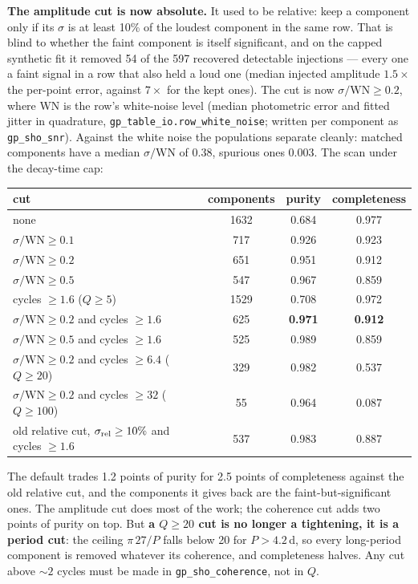 \documentclass[11pt]{article}
\newcommand{\code}[1]{\texttt{#1}}
\begin{document}
\textbf{The amplitude cut is now absolute.} It used to be relative: keep a component only
if its $\sigma$ is at least 10\% of the loudest component in the same row. That is blind to
whether the faint component is itself significant, and on the capped synthetic fit it
removed 54 of the 597 recovered detectable injections --- every one a faint signal in a row
that also held a loud one (median injected amplitude $1.5\times$ the per-point error,
against $7\times$ for the kept ones). The cut is now $\sigma / \mathrm{WN} \ge 0.2$, where WN
is the row's white-noise level (median photometric error and fitted jitter in quadrature,
\code{gp\_table\_io.row\_white\_noise}; written per component as \code{gp\_sho\_snr}). Against
the white noise the populations separate cleanly: matched components have a median
$\sigma/\mathrm{WN}$ of 0.38, spurious ones 0.003. The scan under the decay-time cap:

\begin{center}
\begin{tabular}{lccc}
\toprule
cut & components & purity & completeness \\
\midrule
none                                               & 1632 & 0.684 & 0.977 \\
$\sigma/\mathrm{WN} \ge 0.1$                        &  717 & 0.926 & 0.923 \\
$\sigma/\mathrm{WN} \ge 0.2$                        &  651 & 0.951 & 0.912 \\
$\sigma/\mathrm{WN} \ge 0.5$                        &  547 & 0.967 & 0.859 \\
cycles $\ge 1.6$ ($Q \ge 5$)                        & 1529 & 0.708 & 0.972 \\
$\sigma/\mathrm{WN} \ge 0.2$ and cycles $\ge 1.6$   &  625 & \textbf{0.971} & \textbf{0.912} \\
$\sigma/\mathrm{WN} \ge 0.5$ and cycles $\ge 1.6$   &  525 & 0.989 & 0.859 \\
$\sigma/\mathrm{WN} \ge 0.2$ and cycles $\ge 6.4$ ($Q \ge 20$)  & 329 & 0.982 & 0.537 \\
$\sigma/\mathrm{WN} \ge 0.2$ and cycles $\ge 32$ ($Q \ge 100$)  &  55 & 0.964 & 0.087 \\
\midrule
old relative cut, $\sigma_{\rm rel} \ge 10\%$ and cycles $\ge 1.6$ & 537 & 0.983 & 0.887 \\
\bottomrule
\end{tabular}
\end{center}

The default trades 1.2 points of purity for 2.5 points of completeness against the old
relative cut, and the components it gives back are the faint-but-significant ones. The
amplitude cut does most of the work; the coherence cut adds two points of purity on top.
But \textbf{a $Q \ge 20$ cut is no longer a tightening, it is a period cut}: the ceiling
$\pi\,27/P$ falls below 20 for $P > 4.2$\,d, so every long-period component is removed
whatever its coherence, and completeness halves. Any cut above $\sim 2$ cycles must be made
in \code{gp\_sho\_coherence}, not in $Q$.
\end{document}
